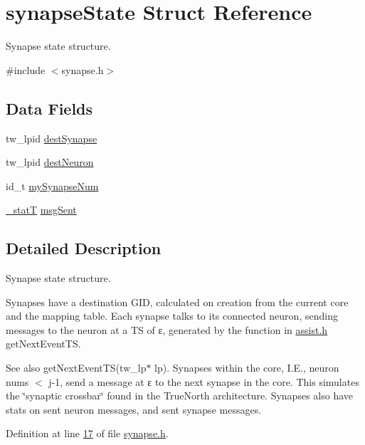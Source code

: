 \hypertarget{structsynapse_state}{}\section{synapse\+State Struct Reference}
\label{structsynapse_state}


Synapse state structure.  




{\ttfamily \#include $<$synapse.\+h$>$}

\subsection*{Data Fields}
\begin{DoxyCompactItemize}
\item 
tw\+\_\+lpid \hyperlink{structsynapse_state_a665999819b255f36d756f17b85bc9a03}{dest\+Synapse}
\item 
tw\+\_\+lpid \hyperlink{structsynapse_state_a0710dca002b4b3a3f7ae72633bef3691}{dest\+Neuron}
\item 
id\+\_\+t \hyperlink{structsynapse_state_ab73db495221608d3eae73d51670d29f0}{my\+Synapse\+Num}
\item 
\hyperlink{assist_8h_ad77e6fc5a9b03d46e7c97b7c4b92e89f}{\+\_\+stat\+T} \hyperlink{structsynapse_state_a7d208d07285a221f4ef19f6fa307b536}{msg\+Sent}
\end{DoxyCompactItemize}


\subsection{Detailed Description}
Synapse state structure. 

Synapses have a destination G\+I\+D, calculated on creation from the current core and the mapping table. Each synapse talks to its connected neuron, sending messages to the neuron at a T\+S of ε, generated by the function in \hyperlink{assist_8h}{assist.\+h} get\+Next\+Event\+T\+S. \begin{DoxySeeAlso}{See also}
get\+Next\+Event\+T\+S(tw\+\_\+lp$\ast$ lp). Synapses within the core, I.\+E., neuron nums $<$ j-\/1, send a message at ε to the next synapse in the core. This simulates the \char`\"{}synaptic crossbar\char`\"{} found in the True\+North architecture. Synapses also have stats on sent neuron messages, and sent synapse messages. 
\end{DoxySeeAlso}


Definition at line \hyperlink{synapse_8h_source_l00017}{17} of file \hyperlink{synapse_8h_source}{synapse.\+h}.



